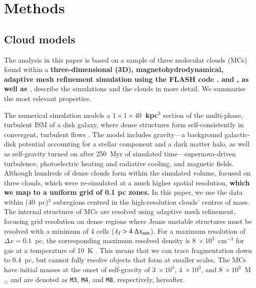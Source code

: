 \section{Methods}\label{methods}


\subsection{Cloud models}\label{methods:clouds}


The analysis in this paper is based on a sample of three molecular clouds (MCs) found within a \textbf{three-dimensional (3D), magnetohydrodynamical, adaptive mesh refinement simulation %
using the FLASH code \citep{Fryxell2000}.  
 and , as well as \citet[ hereafter]{Chira2018}}, describe the simulations and the clouds in more detail. 
We summarise the most relevant properties. 

The numerical simulation models a \textbf{$1\times1\times40$~kpc$^3$} section of the multi-phase, turbulent ISM of a disk galaxy, where dense structures form self-consistently in convergent, turbulent flows .  
The model includes gravity---a background galactic-disk potential accounting for a stellar component and a dark matter halo, as well as self-gravity turned on after 250~Myr of simulated time---supernova-driven turbulence, photoelectric heating and radiative cooling, and magnetic fields. 
Although hundreds of dense clouds form within the simulated volume,  focused on three clouds, which were re-simulated at a much higher spatial resolution, \textbf{which we map to a uniform grid of 0.1 pc zones.}
In this paper, we use the data within (40~pc)$^{3}$ subregions centred in the high-resolution clouds' centres of mass.
The internal structures of MCs are resolved using adaptive mesh refinement, focusing grid resolution on dense regions where Jeans unstable structures must be resolved with a minimum of 4 cells ($\lambda_J > 4~\Delta x_{\rm min}$).
For a maximum resolution of $\Delta x = 0.1$~pc, the corresponding maximum resolved density is $8~\times 10^3$~cm$^{-3}$ for gas at a temperature of 10~K .
This means that we can trace fragmentation down to 0.4~pc, but cannot fully resolve objects that form at smaller scales.
The MCs have initial masses at the onset of self-gravity of $3~\times 10^3$, $4~\times 10^3$, and $8~\times 10^3$~M$_{\odot}$ and are denoted as \texttt{M3}, \texttt{M4}, and \texttt{M8}, respectively, hereafter.

